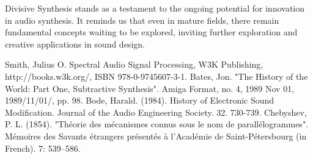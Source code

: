 \documentclass[12pt,a4paper]{article}
\begin{document}
\begin{figure}[h]
\centering
{}


\end{figure}

Divisive Synthesis stands as a testament to the ongoing potential for innovation in audio synthesis. It reminds us that even in mature fields, there remain fundamental concepts waiting to be explored, inviting further exploration and creative applications in sound design.

\printbibliography
\begin{thebibliography}{9}
 Smith, Julius O. 
Spectral Audio Signal Processing,
W3K Publishing, http://books.w3k.org/,
ISBN 978-0-9745607-3-1.
 Bates, Jon. "The History of the World: Part One, Subtractive Synthesis". Amiga Format, no. 4, 1989 Nov 01, 1989/11/01/, pp. 98.
 Bode, Harald. (1984). History of Electronic Sound Modification. Journal of the Audio Engineering Society. 32. 730-739. 
Chebyshev, P. L. (1854). "Théorie des mécanismes connus sous le nom de parallélogrammes". Mémoires des Savants étrangers présentés à l'Académie de Saint-Pétersbourg (in French). 7: 539–586.
\end{thebibliography}
\end{document}
